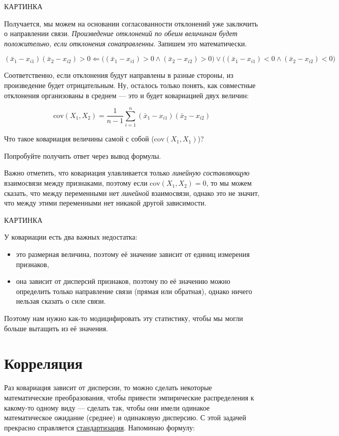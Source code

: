 \documentclass[
  letterpaper,
]{scrbook}
\providecommand{\tightlist}{%
  \setlength{\itemsep}{0pt}\setlength{\parskip}{0pt}}\usepackage{longtable,booktabs,array}
\theoremstyle{definition}
\theoremstyle{remark}
\begin{document}
КАРТИНКА

Получается, мы можем на основании согласованности отклонений уже
заключить о направлении связи. \emph{Произведение отклонений по обеим
величинам будет положительно, если отклонения сонаправленны}. Запишем
это математически.

\[
(\bar x_1 - x_{i1}) (\bar x_2 - x_{i2}) > 0 \Leftarrow \big( (\bar x_1 - x_{i1}) > 0 \wedge (\bar x_2 - x_{i2}) > 0 \big) \vee \big( (\bar x_1 - x_{i1}) < 0 \wedge (\bar x_2 - x_{i2}) < 0 \big)
\]

Соответственно, если отклонения будут направлены в разные стороны, из
произведение будет отрицательным. Ну, осталось только понять, как
совместные отклонения организованы в среднем --- это и будет ковариацией
двух величин:

\[
\mathrm{cov}(X_1, X_2) = \frac{1}{n-1} \sum_{i=1}^n (\bar x_1 - x_{i1}) (\bar x_2 - x_{i2})
\]

Что такое ковариация величины самой с собой
(\(\mathrm{cov}(X_1, X_1)\))?

Попробуйте получить ответ через вывод формулы.

Важно отметить, что ковариация улавливается только \emph{линейную
составляющую} взаимосвязи между признаками, поэтому если
\(\mathrm{cov}(X_1,X_2) = 0\), то мы можем сказать, что между
переменными нет \emph{линейной} взаимосвязи, однако это не значит, что
между этими переменными нет никакой другой зависимости.

КАРТИНКА

У ковариации есть два важных недостатка:

\begin{itemize}
\tightlist
\item
  это размерная величина, поэтому её значение зависит от единиц
  измерения признаков,
\item
  она зависит от дисперсий признаков, поэтому по её значению можно
  определить только направление связи (прямая или обратная), однако
  ничего нельзая сказать о силе связи.
\end{itemize}

Поэтому нам нужно как-то модицифировать эту статистику, чтобы мы могли
больше вытащить из её значения.

\section{Корреляция}\label{andan-corr-cor}

Раз ковариация зависит от дисперсии, то можно сделать некоторые
математические преобразования, чтобы привести эмпирические распределения
к какому-то одному виду --- сделать так, чтобы они имели одинакое
математическое ожидание (среднее) и одинаковую дисперсию. С этой задачей
прекрасно справляется \hyperref[standartization]{стандартизация}.
Напоминаю формулу:
\end{document}
